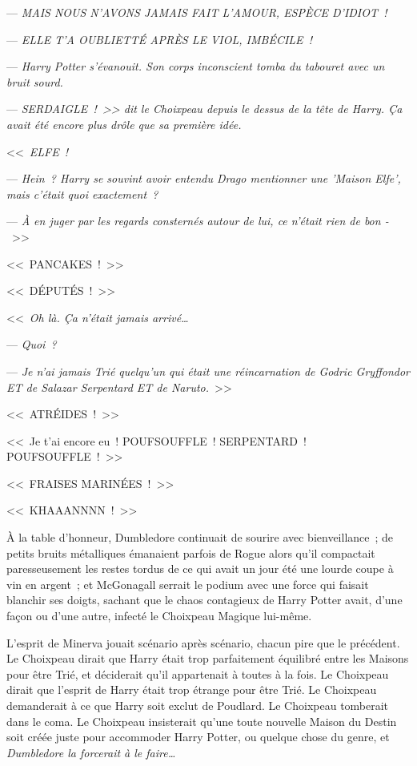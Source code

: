 --- \emph{MAIS NOUS N'AVONS JAMAIS FAIT L'AMOUR, ESPÈCE D'IDIOT~!}

--- \emph{ELLE T'A OUBLIETTÉ APRÈS LE VIOL, IMBÉCILE~!}

--- \emph{Harry Potter s'évanouit. Son corps inconscient tomba du tabouret avec un bruit sourd.}

--- \emph{SERDAIGLE~!~>> dit le Choixpeau depuis le dessus de la tête de Harry. Ça avait été encore plus drôle que sa première idée.}

\later

<<~\emph{ELFE~!}

--- \emph{Hein~? Harry se souvint avoir entendu Drago mentionner une 'Maison Elfe', mais c'était quoi exactement~?}

--- \emph{À en juger par les regards consternés autour de lui, ce n'était rien de bon -}~>>

\later

<<~PANCAKES~!~>>

\later

<<~DÉPUTÉS~!~>>

\later

<<~\emph{Oh là. Ça n'était jamais arrivé…}

--- \emph{Quoi~?}

--- \emph{Je n'ai jamais Trié quelqu'un qui était une réincarnation de Godric Gryffondor ET de Salazar Serpentard ET de Naruto.}~>>

\later

<<~ATRÉIDES~!~>>

\later

<<~Je t'ai encore eu~! POUFSOUFFLE~! SERPENTARD~! POUFSOUFFLE~!~>>

\later

<<~FRAISES MARINÉES~!~>>

\later

<<~KHAAANNNN~!~>>

\later

À la table d'honneur, Dumbledore continuait de sourire avec bienveillance~; de petits bruits métalliques émanaient parfois de Rogue alors qu'il compactait paresseusement les restes tordus de ce qui avait un jour été une lourde coupe à vin en argent~; et McGonagall serrait le podium avec une force qui faisait blanchir ses doigts, sachant que le chaos contagieux de Harry Potter avait, d'une façon ou d'une autre, infecté le Choixpeau Magique lui-même.

L'esprit de Minerva jouait scénario après scénario, chacun pire que le précédent. Le Choixpeau dirait que Harry était trop parfaitement équilibré entre les Maisons pour être Trié, et déciderait qu'il appartenait à toutes à la fois. Le Choixpeau dirait que l'esprit de Harry était trop étrange pour être Trié. Le Choixpeau demanderait à ce que Harry soit exclut de Poudlard. Le Choixpeau tomberait dans le coma. Le Choixpeau insisterait qu'une toute nouvelle Maison du Destin soit créée juste pour accommoder Harry Potter, ou quelque chose du genre, et \emph{Dumbledore la forcerait à le faire…}

